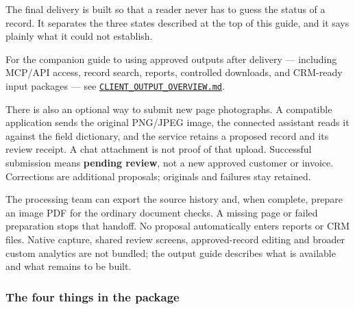 \documentclass[
]{article}
\begin{document}
The final delivery is built so that a reader never has to guess the
status of a record. It separates the three states described at the top
of this guide, and it says plainly what it could not establish.

For the companion guide to using approved outputs after delivery ---
including MCP/API access, record search, reports, controlled downloads,
and CRM-ready input packages --- see
\href{CLIENT_OUTPUT_OVERVIEW.md}{\texttt{CLIENT\_\allowbreak{}OUTPUT\_\allowbreak{}OVERVIEW.md}}.

There is also an optional way to submit new page photographs. A
compatible application sends the original PNG/JPEG image, the connected
assistant reads it against the field dictionary, and the service retains
a proposed record and its review receipt. A chat attachment is not proof
of that upload. Successful submission means \textbf{pending review}, not
a new approved customer or invoice. Corrections are additional
proposals; originals and failures stay retained.

The processing team can export the source history and, when complete,
prepare an image PDF for the ordinary document checks. A missing page or
failed preparation stops that handoff. No proposal automatically enters
reports or CRM files. Native capture, shared review screens,
approved-record editing and broader custom analytics are not bundled;
the output guide describes what is available and what remains to be
built.

\subsubsection{The four things in the
package}\label{the-four-things-in-the-package}
\end{document}
